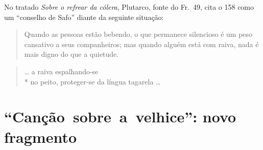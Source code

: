 {{\small No tratado \textit{Sobre o refrear da cólera}, Plutarco, fonte do Fr.~49, cita o
158 como um ``conselho de Safo” diante da seguinte situação:

\begin{quote}
Quando as pessoas estão bebendo, o que permanece silencioso é um peso
cansativo a seus companheiros; mas quando alguém está com raiva, nada é mais
digno do que a quietude.
\end{quote}}

\begin{verse}
\ldots{} a raiva espalhando-se \\*
no peito, proteger-se da língua tagarela \ldots{}
\end{verse}

\chapter{\mbox{“Canção sobre a velhice”:} novo fragmento}

}
